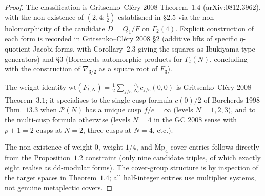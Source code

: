 \begin{proof}
The classification is Gritsenko--Cl\'ery 2008 Theorem~$1.4$
(arXiv:0812.3962), with the non-existence of $(2, 4; \tfrac{1}{2})$
established in \S$2.5$ via the non-holomorphicity of the candidate
$D = Q_1/F$ on $\Gamma_2(4)$. Explicit construction of each form is
recorded in Gritsenko--Cl\'ery 2008 \S$2$ (additive lifts of specific
$\eta$-quotient Jacobi forms, with Corollary~$2.3$ giving the squares
as Ibukiyama-type generators) and \S$3$ (Borcherds automorphic
products for $\Gamma_t(N)$, concluding with the construction of
$\nabla_{3/2}$ as a square root of $F_3$).

The weight identity $\mathrm{wt}(F_{t, N}) = \tfrac{1}{2}
\sum_{f/e} \tfrac{h_e}{N_e} c_{f/e}(0, 0)$ is Gritsenko--Cl\'ery 2008
Theorem~$3.1$; it specialises to the single-cusp formula $c(0)/2$ of
Borcherds 1998 Thm.~$13.3$ when $\mathcal{P}(N)$ has a unique cusp
$f/e = \infty$ (levels $N = 1, 2, 3$), and to the multi-cusp formula
otherwise (levels $N = 4$ in the GC 2008 sense with $p + 1 = 2$ cusps
at $N = 2$, three cusps at $N = 4$, etc.).

The non-existence of weight-$0$, weight-$1/4$, and
$\widetilde{\mathrm{Mp}}_4$-cover entries follows directly from the
Proposition~$1.2$ constraint (only nine candidate triples, of which
exactly eight realise as dd-modular forms). The cover-group structure
is by inspection of the target spaces in Theorem~$1.4$; all half-integer
entries use multiplier systems, not genuine metaplectic covers.
\end{proof}

